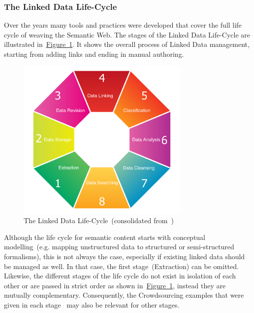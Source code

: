 \subsubsection{The Linked Data Life-Cycle}
Over the years many tools and practices were developed that cover the full life cycle of weaving the Semantic Web. The stages of the Linked Data Life-Cycle are illustrated in~\hyperref[fig:linked_data_life_cycle]{Figure~\ref*{fig:linked_data_life_cycle}}. It shows the overall process of Linked Data management, starting from adding links and ending in manual authoring. 
\begin{figure}
	 \centering
	 \includegraphics[width=0.75\textwidth]{drawio/Linked_Data_Life_Cycle}
	 \caption{The Linked Data Life-Cycle~(consolidated from~\cite{auer2011, auer2012, siorpaes2008})}\label{fig:linked_data_life_cycle}
\end{figure}  
Although the life cycle for semantic content starts with conceptual modelling~(e.g. mapping unstructured data to structured or semi-structured formalisms), this is not always the case, especially if existing linked data should be managed as well. In that case, the first stage~(Extraction) can be omitted. Likewise, the different stages of the life cycle do not exist in isolation of each other or are passed in strict order as shown in~\hyperref[fig:linked_data_life_cycle]{Figure~\ref*{fig:linked_data_life_cycle}}, instead they are mutually complementary. Consequently, the Crowdsourcing examples that were given in each stage~\cite{simperl2013} may also be relevant for other stages. 

